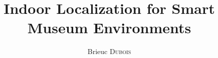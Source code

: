 \documentclass{cover/EPL-master-thesis-covers-EN}
\title{Indoor Localization for Smart Museum Environments}
\author{Brieuc \textsc{Dubois}}
\begin{document}
  \maketitle

  
  
  
  
  
  
  
  
  
  
  

  
  

  \backcoverpage
\end{document}
